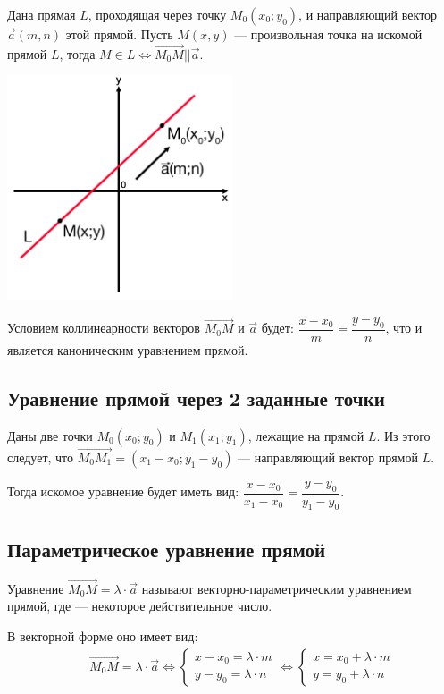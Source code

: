 \documentclass[12pt, fleqn]{extarticle}
\begin{document}
Дана прямая \(L\), проходящая через точку \(M_0(x_0;y_0)\), и направляющий вектор \(\overrightarrow{a}(m, n)\) этой прямой.
Пусть \(M(x, y)\) — произвольная точка на искомой прямой \(L\), тогда \(M \in L \iff \overrightarrow{M_0M} || \overrightarrow{a}\).

\begin{center}
    \includegraphics[width=0.5\textwidth]{kanon_line.png}
\end{center}

Условием коллинеарности векторов \(\overrightarrow{M_0M}\) и \(\overrightarrow{a}\) будет:
\(\dfrac{x - x_0}{m} = \dfrac{y - y_0}{n}\), что и является каноническим уравнением прямой.

\subsection*{Уравнение прямой через 2 заданные точки}

Даны две точки \(M_0(x_0;y_0)\) и \(M_1(x_1;y_1)\), лежащие на прямой \(L\).
Из этого следует, что \(\overrightarrow{M_0M_1} = (x_1 - x_0; y_1 - y_0)\) — направляющий вектор прямой \(L\).

Тогда искомое уравнение будет иметь вид: \(\dfrac{x - x_0}{x_1 - x_0} = \dfrac{y - y_0}{y_1 - y_0}\).

\subsection*{Параметрическое уравнение прямой}

Уравнение \(\overrightarrow{M_0M} = \lambda \cdot \overrightarrow{a}\) называют векторно-параметрическим уравнением прямой, где \lambda — некоторое действительное число.

В векторной форме оно имеет вид:
\begin{align*}
     &  &
    \overrightarrow{M_0M} = \lambda \cdot \overrightarrow{a} \iff
    \begin{cases}
        x - x_0 = \lambda \cdot m \\
        y - y_0 = \lambda \cdot n
    \end{cases}
    \iff
    \begin{cases}
        x = x_0 + \lambda \cdot m \\
        y = y_0 + \lambda \cdot n
    \end{cases}
\end{align*}
\end{document}
